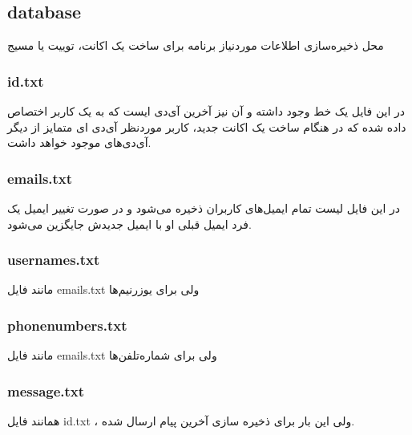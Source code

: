\documentclass[12pt]{article}
\begin{document}
\LTR
\begin{latin}
\subsection*{database}
\end{latin}
\RTL
محل ذخیره‌سازی اطلاعات موردنیاز برنامه برای ساخت یک اکانت، توییت یا مسیج

\LTR
\begin{latin}
\subsubsection*{id.txt}
\end{latin}
\RTL
در این فایل یک خط وجود داشته و آن نیز آخرین آی‌دی ایست که به یک کاربر اختصاص داده شده که در هنگام ساخت یک اکانت جدید‌، کاربر موردنظر آی‌دی ای متمایز از دیگر آی‌دی‌های موجود خواهد داشت.

\LTR
\begin{latin}
\subsubsection*{emails.txt}
\end{latin}
\RTL
در این فایل لیست تمام ایمیل‌های کاربران ذخیره می‌شود و در صورت تغییر ایمیل یک فرد ایمیل قبلی او با ایمیل جدیدش جایگزین می‌شود.

\LTR
\begin{latin}
\subsubsection*{usernames.txt}
\end{latin}
\RTL
مانند فایل emails.txt ولی برای یوزرنیم‌ها

\LTR
\begin{latin}
\subsubsection*{phonenumbers.txt}
\end{latin}
\RTL
مانند فایل emails.txt ولی برای شماره‌تلفن‌ها

\LTR
\begin{latin}
\subsubsection*{message.txt}
\end{latin}
\RTL
همانند فایل id.txt ، ولی این بار برای ذخیره سازی آخرین پیام ارسال شده.
\end{document}
